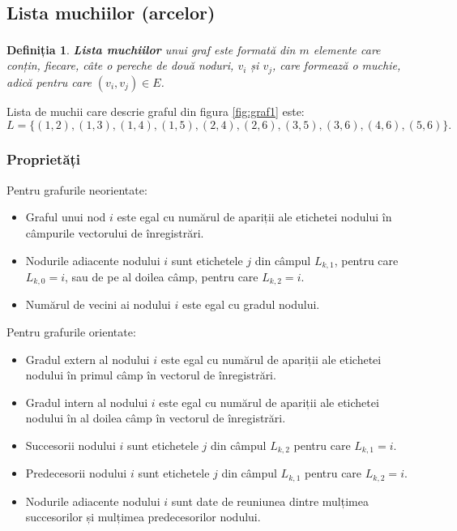 \documentclass[9pt,a4paper]{report}
\newtheorem{definitie}{Definiția}
\begin{document}
\subsection{Lista muchiilor (arcelor)}

\begin{definitie}
    \textbf{Lista muchiilor}\textsuperscript{\cite{milosescu}} unui graf este formată din $m$ elemente care conțin, fiecare, câte o pereche de două noduri, $v_i$ și $v_j$, care formează o muchie, adică pentru care $(v_i,v_j) \in E$.
\end{definitie}

Lista de muchii care descrie graful din figura \ref{fig:graf1} este:
$$L = \{(1,2),(1,3),(1,4),(1,5),(2,4),(2,6),(3,5),(3,6),(4,6),(5,6)\}.$$

\subsubsection*{Proprietăți}

Pentru grafurile neorientate:

\begin{itemize}
    \item Graful unui nod $i$ este egal cu numărul de apariții ale etichetei nodului în câmpurile vectorului de înregistrări.
    \item Nodurile adiacente nodului $i$ sunt etichetele $j$ din câmpul $L_{k,1}$, pentru care $L_{k,0} = i$, sau de pe al doilea câmp, pentru care $L_{k,2} = i$.
    \item Numărul de vecini ai nodului $i$ este egal cu gradul nodului.
\end{itemize}

Pentru grafurile orientate:

\begin{itemize}
    \item Gradul extern al nodului $i$ este egal cu numărul de apariții ale etichetei nodului în primul câmp în vectorul de înregistrări.
    \item Gradul intern al nodului $i$ este egal cu numărul de apariții ale etichetei nodului în al doilea câmp în vectorul de înregistrări.
    \item Succesorii nodului $i$ sunt etichetele $j$ din câmpul $L_{k,2}$ pentru care $L_{k,1} = i$.
    \item Predecesorii nodului $i$ sunt etichetele $j$ din câmpul $L_{k,1}$ pentru care $L_{k,2} = i$.
    \item Nodurile adiacente nodului $i$ sunt date de reuniunea dintre mulțimea succesorilor și mulțimea predecesorilor nodului.
\end{itemize}
\end{document}

